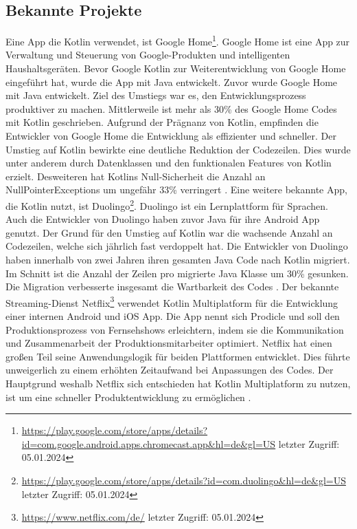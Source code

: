 \documentclass{article}
\begin{document}
\subsection{Bekannte Projekte}
Eine App die Kotlin verwendet, ist Google Home\footnote{\url{https://play.google.com/store/apps/details?id=com.google.android.apps.chromecast.app&hl=de&gl=US} letzter Zugriff: 05.01.2024}. Google Home ist eine App zur Verwaltung und Steuerung von Google-Produkten und intelligenten Haushaltsgeräten. Bevor Google Kotlin zur Weiterentwicklung von Google Home eingeführt hat, wurde die App mit Java entwickelt. Zuvor wurde Google Home mit Java entwickelt. Ziel des Umstiegs war es, den Entwicklungsprozess produktiver zu machen. Mittlerweile ist mehr als 30\% des Google Home Codes mit Kotlin geschrieben. Aufgrund der Prägnanz von Kotlin, empfinden die Entwickler von Google Home die Entwicklung als effizienter und schneller. Der Umstieg auf Kotlin bewirkte eine deutliche Reduktion der Codezeilen. Dies wurde unter anderem durch Datenklassen und den funktionalen Features von Kotlin erzielt. Desweiteren hat Kotlins Null-Sicherheit die Anzahl an NullPointerExceptions um ungefähr 33\% verringert \cite{GoogleHome}.
\newline
Eine weitere bekannte App, die Kotlin nutzt, ist Duolingo\footnote{\url{https://play.google.com/store/apps/details?id=com.duolingo&hl=de&gl=US} letzter Zugriff: 05.01.2024}. Duolingo ist ein Lernplattform für Sprachen. Auch die Entwickler von Duolingo haben zuvor Java für ihre Android App genutzt. Der Grund für den Umstieg auf Kotlin war die wachsende Anzahl an Codezeilen, welche sich jährlich fast verdoppelt hat. Die Entwickler von Duolingo haben innerhalb von zwei Jahren ihren gesamten Java Code nach Kotlin migriert. Im Schnitt ist die Anzahl der Zeilen pro migrierte Java Klasse um 30\% gesunken. Die Migration verbesserte insgesamt die Wartbarkeit des Codes \cite{Duolingo}. \newline
Der bekannte Streaming-Dienst Netflix\footnote{\url{https://www.netflix.com/de/} letzter Zugriff: 05.01.2024} verwendet Kotlin Multiplatform für die Entwicklung einer internen Android und iOS App. Die App nennt sich Prodicle und soll den Produktionsprozess von Fernsehshows erleichtern, indem sie die Kommunikation und Zusammenarbeit der Produktionsmitarbeiter optimiert. Netflix hat einen großen Teil seine Anwendungslogik für beiden Plattformen entwicklet. Dies führte unweigerlich zu einem erhöhten Zeitaufwand bei Anpassungen des Codes. Der Hauptgrund weshalb Netflix sich entschieden hat Kotlin Multiplatform zu nutzen, ist um eine schneller Produktentwicklung zu ermöglichen \cite{Netflx}.
\end{document}
